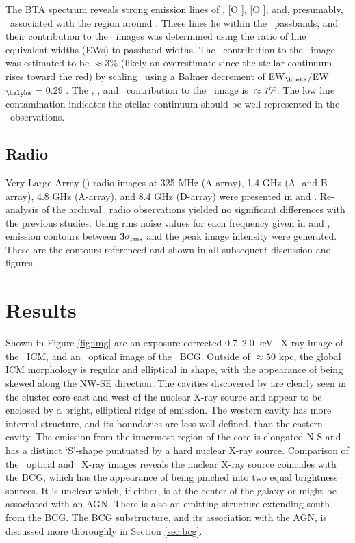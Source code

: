 \documentclass[11pt, preprint]{aastex}
\begin{document}
The BTA spectrum reveals strong emission lines of \hbeta, [O
  ], [O ], and, presumably, \halpha\ associated with
the region around \rbs. These lines lie within the \hst\ passbands,
and their contribution to the \hst\ images was determined using the
ratio of line equivalent widths (EWs) to passband widths. The
\halpha\ contribution to the \myi\ image was estimated to be $\approx
3\%$ (likely an overestimate since the stellar continuum rises toward
the red) by scaling \hbeta\ using a Balmer decrement of
EW$_{\hbeta}$/EW$_{\halpha}$ = 0.29 \citep{2006ApJ...642..775M}. The
\hbeta, \oii, and \oiii\ contribution to the \myv\ image is $\approx
7\%$. The low line contamination indicates the stellar continuum
should be well-represented in the \hst\ observations.

\subsection{Radio}

Very Large Array (\vla) radio images at 325 MHz (A-array), 1.4 GHz (A-
and B-array), 4.8 GHz (A-array), and 8.4 GHz (D-array) were presented
in \citet{gitti06} and \citet{birzan08}. Re-analysis of the archival
\vla\ radio observations yielded no significant differences with the
previous studies. Using rms noise values for each frequency given in
\citet{gitti06} and \citet{birzan08}, emission contours between
$3\sigma_{\rm{rms}}$ and the peak image intensity were
generated. These are the contours referenced and shown in all
subsequent discussion and figures.

\section{Results}
\label{sec:results}

Shown in Figure \ref{fig:img} are an exposure-corrected 0.7--2.0 keV
\cxo\ X-ray image of the \rbs\ ICM, and an \hst\ optical image of the
\rbs\ BCG. Outside of $\approx 50$ kpc, the global ICM morphology is
regular and elliptical in shape, with the appearance of being skewed
along the NW-SE direction. The cavities discovered by
\citet{schindler01} are clearly seen in the cluster core east and west
of the nuclear X-ray source and appear to be enclosed by a bright,
elliptical ridge of emission. The western cavity has more internal
structure, and its boundaries are less well-defined, than the eastern
cavity. The emission from the innermost region of the core is
elongated N-S and has a distinct `S'-shape puntuated by a hard nuclear
X-ray source. Comparison of the \hst\ optical and \cxo\ X-ray images
reveals the nuclear X-ray source coincides with the BCG, which has the
appearance of being pinched into two equal brightness sources. It is
unclear which, if either, is at the center of the galaxy or might be
associated with an AGN. There is also an emitting structure extending
south from the BCG. The BCG substructure, and its association with the
AGN, is discussed more thoroughly in Section \ref{sec:bcg}.
\end{document}
